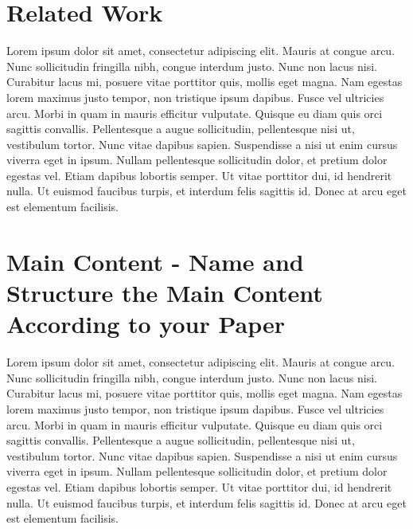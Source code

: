 \section{Related Work}

Lorem ipsum dolor sit amet, consectetur adipiscing elit. Mauris at congue arcu. Nunc sollicitudin fringilla nibh, congue interdum justo. Nunc non lacus nisi. Curabitur lacus mi, posuere vitae porttitor quis, mollis eget magna. Nam egestas lorem maximus justo tempor, non tristique ipsum dapibus. Fusce vel ultricies arcu. Morbi in quam in mauris efficitur vulputate. Quisque eu diam quis orci sagittis convallis. Pellentesque a augue sollicitudin, pellentesque nisi ut, vestibulum tortor. Nunc vitae dapibus sapien. Suspendisse a nisi ut enim cursus viverra eget in ipsum. Nullam pellentesque sollicitudin dolor, et pretium dolor egestas vel. Etiam dapibus lobortis semper. Ut vitae porttitor dui, id hendrerit nulla. Ut euismod faucibus turpis, et interdum felis sagittis id. Donec at arcu eget est elementum facilisis.

\section{Main Content - Name and Structure the Main Content According to your Paper}

Lorem ipsum dolor sit amet, consectetur adipiscing elit. Mauris at congue arcu. Nunc sollicitudin fringilla nibh, congue interdum justo. Nunc non lacus nisi. Curabitur lacus mi, posuere vitae porttitor quis, mollis eget magna. Nam egestas lorem maximus justo tempor, non tristique ipsum dapibus. Fusce vel ultricies arcu. Morbi in quam in mauris efficitur vulputate. Quisque eu diam quis orci sagittis convallis. Pellentesque a augue sollicitudin, pellentesque nisi ut, vestibulum tortor. Nunc vitae dapibus sapien. Suspendisse a nisi ut enim cursus viverra eget in ipsum. Nullam pellentesque sollicitudin dolor, et pretium dolor egestas vel. Etiam dapibus lobortis semper. Ut vitae porttitor dui, id hendrerit nulla. Ut euismod faucibus turpis, et interdum felis sagittis id. Donec at arcu eget est elementum facilisis.

